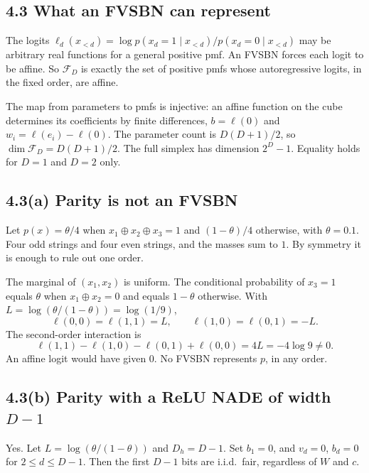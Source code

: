 \documentclass[11pt]{article}
\theoremstyle{remark}
\begin{document}
\subsection*{4.3 What an FVSBN can represent}

The logits \(\ell_d(x_{<d})=\log p(x_d=1\mid x_{<d})/p(x_d=0\mid x_{<d})\) may be arbitrary real functions for a general positive pmf. An FVSBN forces each logit to be affine. So \(\mathcal{F}_D\) is exactly the set of positive pmfs whose autoregressive logits, in the fixed order, are affine.

The map from parameters to pmfs is injective: an affine function on the cube determines its coefficients by finite differences, \(b=\ell(0)\) and \(w_i=\ell(e_i)-\ell(0)\). The parameter count is \(D(D+1)/2\), so \(\dim\mathcal{F}_D=D(D+1)/2\). The full simplex has dimension \(2^D-1\). Equality holds for \(D=1\) and \(D=2\) only.

\subsection*{4.3(a) Parity is not an FVSBN}

Let \(p(x)=\theta/4\) when \(x_1\oplus x_2\oplus x_3=1\) and \((1-\theta)/4\) otherwise, with \(\theta=0.1\). Four odd strings and four even strings, and the masses sum to \(1\). By symmetry it is enough to rule out one order.

The marginal of \((x_1,x_2)\) is uniform. The conditional probability of \(x_3=1\) equals \(\theta\) when \(x_1\oplus x_2=0\) and equals \(1-\theta\) otherwise. With \(L=\log(\theta/(1-\theta))=\log(1/9)\),
\[
\ell(0,0)=\ell(1,1)=L,\qquad\ell(1,0)=\ell(0,1)=-L.
\]
The second-order interaction is
\[
\ell(1,1)-\ell(1,0)-\ell(0,1)+\ell(0,0)=4L=-4\log 9\ne 0.
\]
An affine logit would have given \(0\). No FVSBN represents \(p\), in any order.

\subsection*{4.3(b) Parity with a ReLU NADE of width \texorpdfstring{\(D-1\)}{D-1}}

Yes. Let \(L=\log(\theta/(1-\theta))\) and \(D_h=D-1\). Set \(b_1=0\), and \(v_d=0\), \(b_d=0\) for \(2\le d\le D-1\). Then the first \(D-1\) bits are i.i.d.\ fair, regardless of \(W\) and \(c\).
\end{document}
